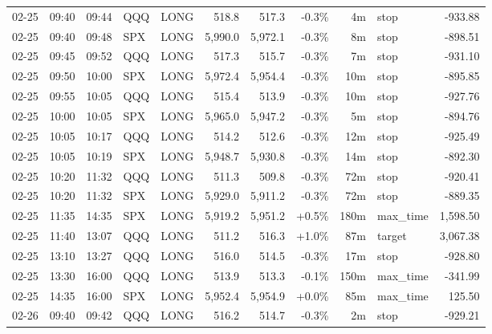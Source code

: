 \documentclass[11pt,a4paper,twoside]{article}
\begin{document}
\begin{center}
\begin{longtable}{>{\color{txtmain}}l l l l l r r r r >{\color{txtmain}}l r}
02-25 & 09:40 & 09:44 & QQQ & LONG & 518.8 & 517.3 & \textcolor{lossred}{-0.3\%} & 4m & stop & \textcolor{lossred}{-933.88} \\
02-25 & 09:40 & 09:48 & SPX & LONG & 5,990.0 & 5,972.1 & \textcolor{lossred}{-0.3\%} & 8m & stop & \textcolor{lossred}{-898.51} \\
02-25 & 09:45 & 09:52 & QQQ & LONG & 517.3 & 515.7 & \textcolor{lossred}{-0.3\%} & 7m & stop & \textcolor{lossred}{-931.10} \\
02-25 & 09:50 & 10:00 & SPX & LONG & 5,972.4 & 5,954.4 & \textcolor{lossred}{-0.3\%} & 10m & stop & \textcolor{lossred}{-895.85} \\
02-25 & 09:55 & 10:05 & QQQ & LONG & 515.4 & 513.9 & \textcolor{lossred}{-0.3\%} & 10m & stop & \textcolor{lossred}{-927.76} \\
02-25 & 10:00 & 10:05 & SPX & LONG & 5,965.0 & 5,947.2 & \textcolor{lossred}{-0.3\%} & 5m & stop & \textcolor{lossred}{-894.76} \\
02-25 & 10:05 & 10:17 & QQQ & LONG & 514.2 & 512.6 & \textcolor{lossred}{-0.3\%} & 12m & stop & \textcolor{lossred}{-925.49} \\
02-25 & 10:05 & 10:19 & SPX & LONG & 5,948.7 & 5,930.8 & \textcolor{lossred}{-0.3\%} & 14m & stop & \textcolor{lossred}{-892.30} \\
02-25 & 10:20 & 11:32 & QQQ & LONG & 511.3 & 509.8 & \textcolor{lossred}{-0.3\%} & 72m & stop & \textcolor{lossred}{-920.41} \\
02-25 & 10:20 & 11:32 & SPX & LONG & 5,929.0 & 5,911.2 & \textcolor{lossred}{-0.3\%} & 72m & stop & \textcolor{lossred}{-889.35} \\
02-25 & 11:35 & 14:35 & SPX & LONG & 5,919.2 & 5,951.2 & \textcolor{wingreen}{+0.5\%} & 180m & max\_time & \textcolor{wingreen}{1,598.50} \\
02-25 & 11:40 & 13:07 & QQQ & LONG & 511.2 & 516.3 & \textcolor{wingreen}{+1.0\%} & 87m & target & \textcolor{wingreen}{3,067.38} \\
02-25 & 13:10 & 13:27 & QQQ & LONG & 516.0 & 514.5 & \textcolor{lossred}{-0.3\%} & 17m & stop & \textcolor{lossred}{-928.80} \\
02-25 & 13:30 & 16:00 & QQQ & LONG & 513.9 & 513.3 & \textcolor{lossred}{-0.1\%} & 150m & max\_time & \textcolor{lossred}{-341.99} \\
02-25 & 14:35 & 16:00 & SPX & LONG & 5,952.4 & 5,954.9 & \textcolor{wingreen}{+0.0\%} & 85m & max\_time & \textcolor{wingreen}{125.50} \\
02-26 & 09:40 & 09:42 & QQQ & LONG & 516.2 & 514.7 & \textcolor{lossred}{-0.3\%} & 2m & stop & \textcolor{lossred}{-929.21} \\

\end{longtable}
\end{center}
\end{document}
